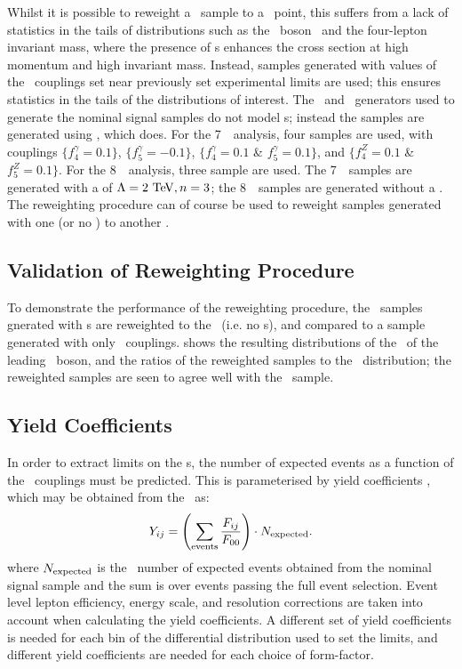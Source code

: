 Whilst it is possible to reweight a \sm\ sample to a \TGC\ point, this suffers
from a lack of statistics in the tails of distributions such as the \Z\ boson \pt\ 
and the four-lepton invariant mass, where the presence of \TGC s
enhances the cross section at high momentum and high invariant mass. Instead,
samples generated with values of the \TGC\ couplings set near previously set
experimental limits are used; this ensures statistics in the tails of the
distributions of interest. The \powhegbox\ and \ggZZ\ generators used to generate the nominal signal
samples do not model \TGC s; instead the samples are generated using \sherpa,
which does. For the 7~\tev\ analysis, four samples are used, with couplings
 $\{f_{4}^{\gamma}=0.1\}$, $\{f_{5}^{\gamma}=-0.1\}$,
$\{f_{4}^{\gamma}=0.1$ \& $f_{5}^{\gamma}=0.1\}$, and 
$\{f_{4}^{Z}=0.1$ \& $f_5^{Z}=0.1\}$. For the 8~\tev\ analysis, three sample are used. The 7~\tev\ samples are
generated with a \formfactor of $\Lambda=2\tev,n=3$; the 8~\tev\ samples are
generated without a \formfactor. The reweighting procedure can of course be used to
reweight samples generated with one \formfactor (or no \formfactor) to another
\formfactor.

\subsection{Validation of Reweighting Procedure}

To demonstrate the performance of the reweighting procedure, the \sherpa\
samples gnerated with \TGC s are reweighted to the \sm\ (i.e. no \TGC s), and
compared to a sample generated with only \sm\ couplings. \fig{} shows the
resulting distributions of the \pt\ of the leading \Z\ boson, and the ratios of
the reweighted samples to the \sm\ distribution; the reweighted samples are seen
to agree well with the \sm\ sample.

\subsection{Yield Coefficients}

In order to extract limits on the \TGC s, the number of expected events as a
function of the \TGC\ couplings must be predicted. This is parameterised by
yield coefficients \Yij, which may be obtained from the \Fij\ as:
\begin{equation}
Y_{ij} = \left( \sum_{\rm events} \frac{F_{ij}}{F_{00} } \right) \cdot{N_{\rm expected}}.
\end{equation}
where $N_{\rm expected}$ is the \sm\ number of expected events obtained from the
nominal signal sample and the sum is over events passing the full event
selection. Event level lepton efficiency, energy scale, and resolution corrections
are taken into account when calculating the yield coefficients. A different set of yield
coefficients is needed for each bin of the differential distribution used to set
the limits, and different yield coefficients are needed for each choice of
form-factor. 

